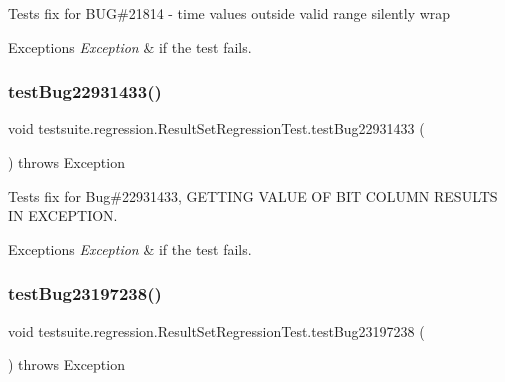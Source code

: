 Tests fix for B\+UG\#21814 -\/ time values outside valid range silently wrap


\begin{DoxyExceptions}{Exceptions}
{\em Exception} & if the test fails. \\
\hline
\end{DoxyExceptions}
\mbox{\label{classtestsuite_1_1regression_1_1_result_set_regression_test_a4280c4f75edf35720e0d0c71a78dfc3b}} 
\subsubsection{\texorpdfstring{test\+Bug22931433()}{testBug22931433()}}
{\footnotesize\ttfamily void testsuite.\+regression.\+Result\+Set\+Regression\+Test.\+test\+Bug22931433 (\begin{DoxyParamCaption}{ }\end{DoxyParamCaption}) throws Exception}

Tests fix for Bug\#22931433, G\+E\+T\+T\+I\+NG V\+A\+L\+UE OF B\+IT C\+O\+L\+U\+MN R\+E\+S\+U\+L\+TS IN E\+X\+C\+E\+P\+T\+I\+ON.


\begin{DoxyExceptions}{Exceptions}
{\em Exception} & if the test fails. \\
\hline
\end{DoxyExceptions}
\mbox{\label{classtestsuite_1_1regression_1_1_result_set_regression_test_ac1e7b24d29571cdb490adf701dafaf34}} 
\subsubsection{\texorpdfstring{test\+Bug23197238()}{testBug23197238()}}
{\footnotesize\ttfamily void testsuite.\+regression.\+Result\+Set\+Regression\+Test.\+test\+Bug23197238 (\begin{DoxyParamCaption}{ }\end{DoxyParamCaption}) throws Exception}

